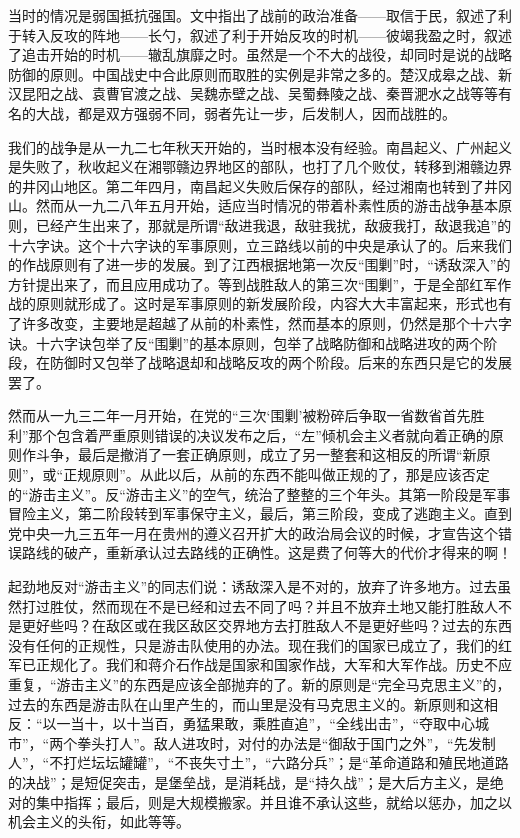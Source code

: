 当时的情况是弱国抵抗强国。文中指出了战前的政治准备——取信于民，叙述了利于转入反攻的阵地——长勺，叙述了利于开始反攻的时机——彼竭我盈之时，叙述了追击开始的时机——辙乱旗靡之时。虽然是一个不大的战役，却同时是说的战略防御的原则。中国战史中合此原则而取胜的实例是非常之多的。楚汉成皋之战、新汉昆阳之战、袁曹官渡之战、吴魏赤壁之战、吴蜀彝陵之战、秦晋淝水之战等等有名的大战，都是双方强弱不同，弱者先让一步，后发制人，因而战胜的。

我们的战争是从一九二七年秋天开始的，当时根本没有经验。南昌起义、广州起义是失败了，秋收起义在湘鄂赣边界地区的部队，也打了几个败仗，转移到湘赣边界的井冈山地区。第二年四月，南昌起义失败后保存的部队，经过湘南也转到了井冈山。然而从一九二八年五月开始，适应当时情况的带着朴素性质的游击战争基本原则，已经产生出来了，那就是所谓“敌进我退，敌驻我扰，敌疲我打，敌退我追”的十六字诀。这个十六字诀的军事原则，立三路线以前的中央是承认了的。后来我们的作战原则有了进一步的发展。到了江西根据地第一次反“围剿”时，“诱敌深入”的方针提出来了，而且应用成功了。等到战胜敌人的第三次“围剿”，于是全部红军作战的原则就形成了。这时是军事原则的新发展阶段，内容大大丰富起来，形式也有了许多改变，主要地是超越了从前的朴素性，然而基本的原则，仍然是那个十六字诀。十六字诀包举了反“围剿”的基本原则，包举了战略防御和战略进攻的两个阶段，在防御时又包举了战略退却和战略反攻的两个阶段。后来的东西只是它的发展罢了。

然而从一九三二年一月开始，在党的“三次‘围剿’被粉碎后争取一省数省首先胜利”那个包含着严重原则错误的决议发布之后，“左”倾机会主义者就向着正确的原则作斗争，最后是撤消了一套正确原则，成立了另一整套和这相反的所谓“新原则”，或“正规原则”。从此以后，从前的东西不能叫做正规的了，那是应该否定的“游击主义”。反“游击主义”的空气，统治了整整的三个年头。其第一阶段是军事冒险主义，第二阶段转到军事保守主义，最后，第三阶段，变成了逃跑主义。直到党中央一九三五年一月在贵州的遵义召开扩大的政治局会议的时候，才宣告这个错误路线的破产，重新承认过去路线的正确性。这是费了何等大的代价才得来的啊！

起劲地反对“游击主义”的同志们说：诱敌深入是不对的，放弃了许多地方。过去虽然打过胜仗，然而现在不是已经和过去不同了吗？并且不放弃土地又能打胜敌人不是更好些吗？在敌区或在我区敌区交界地方去打胜敌人不是更好些吗？过去的东西没有任何的正规性，只是游击队使用的办法。现在我们的国家已成立了，我们的红军已正规化了。我们和蒋介石作战是国家和国家作战，大军和大军作战。历史不应重复，“游击主义”的东西是应该全部抛弃的了。新的原则是“完全马克思主义”的，过去的东西是游击队在山里产生的，而山里是没有马克思主义的。新原则和这相反：“以一当十，以十当百，勇猛果敢，乘胜直追”，“全线出击”，“夺取中心城市”，“两个拳头打人”。敌人进攻时，对付的办法是“御敌于国门之外”，“先发制人”，“不打烂坛坛罐罐”，“不丧失寸土”，“六路分兵”；是“革命道路和殖民地道路的决战”；是短促突击，是堡垒战，是消耗战，是“持久战”；是大后方主义，是绝对的集中指挥；最后，则是大规模搬家。并且谁不承认这些，就给以惩办，加之以机会主义的头衔，如此等等。

